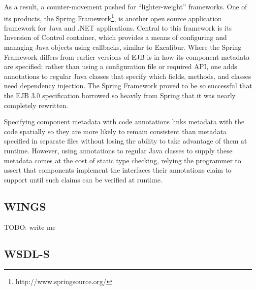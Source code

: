 \documentclass{article}
\begin{document}
As a result, a counter-movement pushed for ``lighter-weight'' frameworks.
One of its products, the Spring Framework\footnote{http://www.springsource.org/}, is another open source application framework for Java and .NET applications.
Central to this framework is its Inversion of Control container, which provides a means of configuring and managing Java objects using callbacks, similar to Excalibur.
Where the Spring Framework differs from earlier versions of EJB is in how its component metadata are specified:  rather than using a configuration file or required API, one adds annotations to regular Java classes that specify which fields, methods, and classes need dependency injection.
The Spring Framework proved to be so successful that the EJB 3.0 specification borrowed so heavily from Spring that it was nearly completely rewritten.

Specifying component metadata with code annotations links metadata with the code spatially so they are more likely to remain consistent than metadata specified in separate files without losing the ability to take advantage of them at runtime.
However, using annotations to regular Java classes to supply these metadata comes at the cost of static type checking, relying the programmer to assert that components implement the interfaces their annotations claim to support until such claims can be verified at runtime.


\subsection{WINGS}

TODO:  write me


\subsection{WSDL-S}
\end{document}
